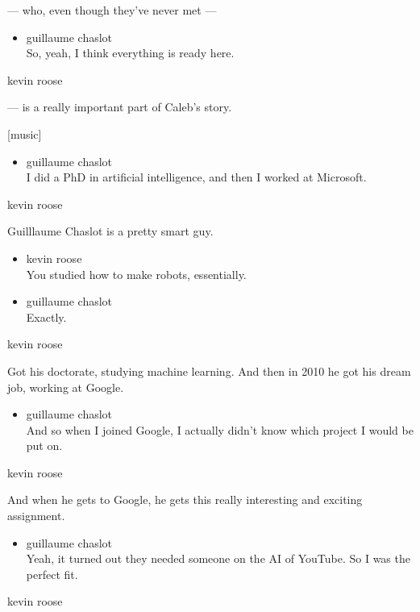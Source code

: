 --- who, even though they've never met ---

\begin{itemize}
\tightlist
\item
  guillaume chaslot\\
  So, yeah, I think everything is ready here.
\end{itemize}

kevin roose

--- is a really important part of Caleb's story.

{[}music{]}

\begin{itemize}
\tightlist
\item
  guillaume chaslot\\
  I did a PhD in artificial intelligence, and then I worked at
  Microsoft.
\end{itemize}

kevin roose

Guilllaume Chaslot is a pretty smart guy.

\begin{itemize}
\item
  kevin roose\\
  You studied how to make robots, essentially.
\item
  guillaume chaslot\\
  Exactly.
\end{itemize}

kevin roose

Got his doctorate, studying machine learning. And then in 2010 he got
his dream job, working at Google.

\begin{itemize}
\tightlist
\item
  guillaume chaslot\\
  And so when I joined Google, I actually didn't know which project I
  would be put on.
\end{itemize}

kevin roose

And when he gets to Google, he gets this really interesting and exciting
assignment.

\begin{itemize}
\tightlist
\item
  guillaume chaslot\\
  Yeah, it turned out they needed someone on the AI of YouTube. So I was
  the perfect fit.
\end{itemize}

kevin roose

